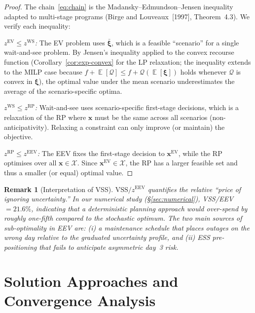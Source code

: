 \documentclass[11pt]{article}
\DeclareMathOperator*{\E}{\mathbb{E}}
\newtheorem{remark}{Remark}
\begin{document}
\begin{proof}
The chain~\eqref{eq:chain} is the Madansky--Edmundson--Jensen
inequality adapted to multi-stage programs (Birge and Louveaux~[1997],
Theorem~4.3). We verify each inequality:

\emph{$z^{\mathrm{EV}} \leq z^{\mathrm{WS}}$:}
The EV problem uses $\bar{\boldsymbol{\xi}}$, which is a feasible
``scenario'' for a single wait-and-see problem. By Jensen's inequality
applied to the convex recourse function (Corollary~\ref{cor:exp-convex}
for the LP relaxation; the inequality extends to the MILP case because
$f + \E[\mathcal{Q}] \leq f + \mathcal{Q}(\E[\boldsymbol{\xi}])$ holds
whenever $\mathcal{Q}$ is convex in $\boldsymbol{\xi}$),
the optimal value under the mean scenario underestimates the average
of the scenario-specific optima.

\emph{$z^{\mathrm{WS}} \leq z^{\mathrm{RP}}$:}
Wait-and-see uses scenario-specific first-stage decisions, which is a
relaxation of the RP where $\mathbf{x}$ must be the same across all
scenarios (non-anticipativity). Relaxing a constraint can only improve
(or maintain) the objective.

\emph{$z^{\mathrm{RP}} \leq z^{\mathrm{EEV}}$:}
The EEV fixes the first-stage decision to $\mathbf{x}^{\mathrm{EV}}$,
while the RP optimises over all $\mathbf{x} \in \mathcal{X}$. Since
$\mathbf{x}^{\mathrm{EV}} \in \mathcal{X}$, the RP has a larger
feasible set and thus a smaller (or equal) optimal value.
\end{proof}

\begin{remark}[Interpretation of VSS]\label{rem:vss}
$\mathrm{VSS}/z^{\mathrm{EEV}}$ quantifies the relative ``price of
ignoring uncertainty.'' In our numerical study
(\S\ref{sec:numerical}), VSS/EEV $= 21.6\%$, indicating that a
deterministic planning approach would over-spend by roughly one-fifth
compared to the stochastic optimum. The two main sources of sub-optimality
in EEV are: (i) a maintenance schedule that places outages on the
wrong day relative to the graduated uncertainty profile, and (ii) ESS
pre-positioning that fails to anticipate asymmetric day~3 risk.
\end{remark}

\section{Solution Approaches and Convergence Analysis}
\label{sec:solution}
\end{document}
